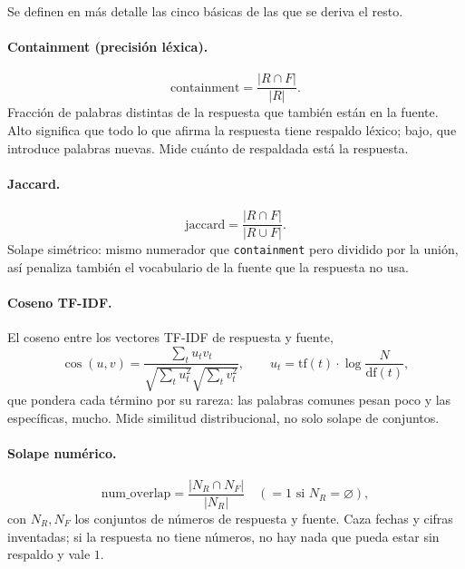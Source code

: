 \documentclass[12pt,a4paper]{report}
\theoremstyle{definition}
\newcommand{\tc}[1]{\texttt{#1}}
\begin{document}
Se definen en más detalle las cinco básicas de las que se deriva el resto.

\paragraph{Containment (precisión léxica).}
\begin{equation}
\text{containment} = \frac{|R \cap F|}{|R|}.
\end{equation}
Fracción de palabras distintas de la respuesta que también están en la fuente. Alto
significa que todo lo que afirma la respuesta tiene respaldo léxico; bajo, que introduce
palabras nuevas. Mide cuánto de respaldada está la respuesta.

\paragraph{Jaccard.}
\begin{equation}
\text{jaccard} = \frac{|R \cap F|}{|R \cup F|}.
\end{equation}
Solape simétrico: mismo numerador que \tc{containment} pero dividido por la unión, así
penaliza también el vocabulario de la fuente que la respuesta no usa.

\paragraph{Coseno TF-IDF.} El coseno entre los vectores TF-IDF de
respuesta y fuente,
\begin{equation}
\cos(u,v)=\frac{\sum_t u_t v_t}{\sqrt{\sum_t u_t^2}\sqrt{\sum_t v_t^2}},
\qquad u_t = \text{tf}(t)\cdot\log\frac{N}{\text{df}(t)},
\end{equation}
que pondera cada término por su rareza: las palabras comunes pesan poco y las específicas,
mucho. Mide similitud distribucional, no solo solape de conjuntos.

\paragraph{Solape numérico.}
\begin{equation}
\text{num\_overlap} = \frac{|N_R \cap N_F|}{|N_R|}\quad(=1 \text{ si } N_R=\varnothing),
\end{equation}
con $N_R, N_F$ los conjuntos de números de respuesta y fuente. Caza fechas y cifras
inventadas; si la respuesta no tiene números, no hay nada que pueda estar sin respaldo y
vale $1$.
\end{document}
